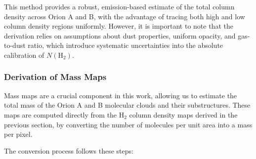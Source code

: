 This method provides a robust, emission-based estimate of the total column density across Orion A and B, with the advantage of tracing both high and low column density regions uniformly. 
However, it is important to note that the derivation relies on assumptions about dust properties, uniform opacity, and gas-to-dust ratio, which introduce systematic uncertainties into the absolute calibration of $N(\mathrm{H}_2)$.


\subsubsection{Derivation of Mass Maps}

Mass maps are a crucial component in this work, allowing us to estimate the total mass of the Orion A and B molecular clouds and their substructures. These maps are computed directly from the H$_2$ column density maps derived in the previous section, by converting the number of molecules per unit area into a mass per pixel.

The conversion process follows these steps:

